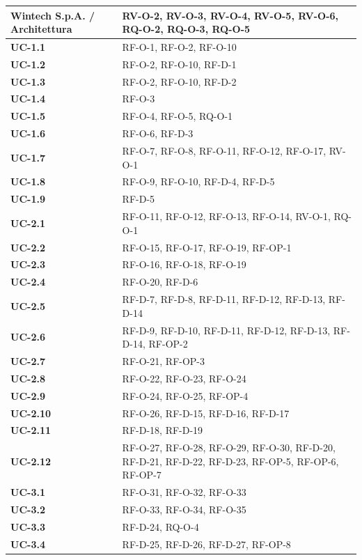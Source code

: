 \begin{longtable}{ p{} p{} }
\textbf{Wintech S.p.A. / Architettura} & RV-O-2, RV-O-3, RV-O-4, RV-O-5, RV-O-6, RQ-O-2, RQ-O-3, RQ-O-5 \\ \midrule
\textbf{UC-1.1} & RF-O-1, RF-O-2, RF-O-10 \\ \midrule
\textbf{UC-1.2} & RF-O-2, RF-O-10, RF-D-1 \\ \midrule
\textbf{UC-1.3} & RF-O-2, RF-O-10, RF-D-2 \\ \midrule
\textbf{UC-1.4} & RF-O-3 \\ \midrule
\textbf{UC-1.5} & RF-O-4, RF-O-5, RQ-O-1 \\ \midrule
\textbf{UC-1.6} & RF-O-6, RF-D-3 \\ \midrule
\textbf{UC-1.7} & RF-O-7, RF-O-8, RF-O-11, RF-O-12, RF-O-17, RV-O-1 \\ \midrule
\textbf{UC-1.8} & RF-O-9, RF-O-10, RF-D-4, RF-D-5 \\ \midrule
\textbf{UC-1.9} & RF-D-5 \\ \midrule
\textbf{UC-2.1} & RF-O-11, RF-O-12, RF-O-13, RF-O-14, RV-O-1, RQ-O-1 \\ \midrule
\textbf{UC-2.2} & RF-O-15, RF-O-17, RF-O-19, RF-OP-1 \\ \midrule
\textbf{UC-2.3} & RF-O-16, RF-O-18, RF-O-19 \\ \midrule
\textbf{UC-2.4} & RF-O-20, RF-D-6 \\ \midrule
\textbf{UC-2.5} & RF-D-7, RF-D-8, RF-D-11, RF-D-12, RF-D-13, RF-D-14 \\ \midrule
\textbf{UC-2.6} & RF-D-9, RF-D-10, RF-D-11, RF-D-12, RF-D-13, RF-D-14, RF-OP-2 \\ \midrule
\textbf{UC-2.7} & RF-O-21, RF-OP-3 \\ \midrule
\textbf{UC-2.8} & RF-O-22, RF-O-23, RF-O-24 \\ \midrule
\textbf{UC-2.9} & RF-O-24, RF-O-25, RF-OP-4 \\ \midrule
\textbf{UC-2.10} & RF-O-26, RF-D-15, RF-D-16, RF-D-17 \\ \midrule
\textbf{UC-2.11} & RF-D-18, RF-D-19 \\ \midrule
\textbf{UC-2.12} & RF-O-27, RF-O-28, RF-O-29, RF-O-30, RF-D-20, RF-D-21, RF-D-22, RF-D-23, RF-OP-5, RF-OP-6, RF-OP-7 \\ \midrule
\textbf{UC-3.1} & RF-O-31, RF-O-32, RF-O-33 \\ \midrule
\textbf{UC-3.2} & RF-O-33, RF-O-34, RF-O-35 \\ \midrule
\textbf{UC-3.3} & RF-D-24, RQ-O-4 \\ \midrule
\textbf{UC-3.4} & RF-D-25, RF-D-26, RF-D-27, RF-OP-8 \\ \midrule

\end{longtable}
